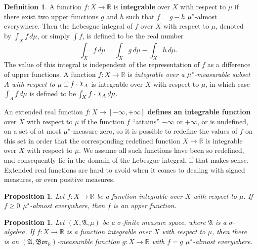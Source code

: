 \documentclass[
twoside=true,
paper=letter,
fontsize=9pt,
pagesize=auto,
leqno,
openany,
headsepline,
overfullrule,
]{scrbook}
\theoremstyle{plain}
\theoremstyle{plain}
\newtheorem{prop}[thm]{Proposition}
\theoremstyle{definition}
\newtheorem{defn}[thm]{Definition}
\theoremstyle{bfnoteitalic}
\theoremstyle{bfnoteroman}
\newcommand{\term}[1]{\textbf{#1}\index{#1}}
\newcommand{\sigalg}[1]{\mathfrak{#1}}
\newcommand{\borel}{\mathfrak{Bor}}
\newcommand{\textsigma}{\hbox{\large{$\sigma$}}\kern-1pt}
\newcommand{\charfunction}[1]{{\raisebox{2pt}{$\chi$}}_{#1}}
\newcommand{\R}{\mathbb{R}}
\newcommand{\sigmaalgebra}{\sigalg{A}}
\newcommand{\kernast}{\ast\kern-1pt}
\newcommand{\funcf}{f}
\newcommand{\funcg}{g}
\newcommand{\function}{f}
\newcommand{\measurespace}{X}
\newcommand{\measure}{\mu}
\begin{document}
\begin{defn}\label{integrable}
A function $f:\measurespace\to\R$ is 
\textbf{integrable} over $\measurespace$ with respect to $\measure$
if there exist two upper functions $g$ and $h$ such that $f = g - h$ $\measure^\kernast$-almost everywhere.  Then the Lebesgue integral  of $f$ over $\measurespace$ with respect to $\measure$, denoted by $\int_\measurespace f\, d\measure$, or simply $\int f$, is defined to be the real number
\[
\int_\measurespace f\,d\measure = \int_\measurespace g\, d\measure -\int_\measurespace h \, d \measure.
\]
The value of this integral is independent of the representation of $f$ as a difference of upper functions.
A function $f:\measurespace\to\R$ is 
\emph{integrable over a $\measure^\kernast$-measurable subset $A$ with respect to $\measure$}
if $f\cdot\charfunction{A}$ is integrable over $\measurespace$ with respect to
$\measure$, in which case $\int_A f\, d\measure$ is defined to be $\int_\measurespace f\cdot\charfunction{A}\, d\measure$.

An extended real function $\function:\measurespace\to [-\infty,+\infty]$ 
\term{defines an integrable function} over $\measurespace$
with respect to $\measure$
if the function $\function$ ``attains'' $-\infty$ or $+\infty$, or is undefined, on a set of at most 
$\measure^\kernast$-measure zero, so it is possible to redefine the values of $\function$ on this set in order that the corresponding redefined function 
$\measurespace\to\R$ is integrable over $\measurespace$ with respect to $\measure$.
We assume all such functions have been so redefined, and consequently lie in the domain of the Lebesgue integral, if that makes sense. Extended real functions are hard to avoid when it comes to dealing with signed measures, or even positive measures.
\end{defn}






\begin{prop}\label{integrable_and_positive_is_upper}
Let $f:\measurespace\to\R$ be a function integrable over $\measurespace$ with respect to $\measure$.   If $f\geq 0$ $\measure^\kernast$-almost everywhere, then $f$ is an upper function.
\end{prop}


\begin{prop}\label{sigma_algebra_measurable}
Let $(\measurespace,\sigmaalgebra,\measure)$ be a \textsigma\hyp{}finite measure space, where $\sigmaalgebra$ is a \textsigma\hyp{}algebra.
If $f:\measurespace\to\R$ is a function integrable over $\measurespace$ with respect to $\measure$,
then there is an $(\sigmaalgebra,\borel_\R)$\hyp{}measurable
function $\funcg:\measurespace\to\R$
with $\funcf = \funcg$ $\measure^\kernast$\hyp{}almost everywhere.
\end{prop}
\end{document}
